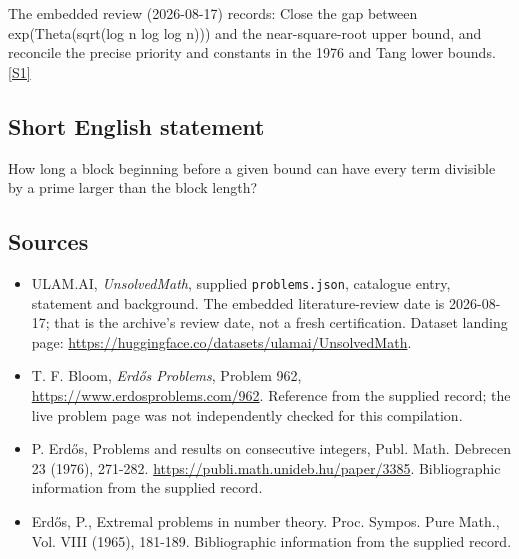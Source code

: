 \documentclass[11pt,a4paper]{article}
\newcommand{\sref}[2]{\hyperlink{source:#1:#2}{[S#2]}}
\begin{document}
The embedded review (2026-08-17) records: Close the gap between exp(Theta(sqrt(log n log log n))) and the near-square-root upper bound, and reconcile the precise priority and constants in the 1976 and Tang lower bounds. \sref{statement}{1}

\subsection{Short English statement}

How long a block beginning before a given bound can have every term divisible by a prime larger than the block length?

\subsection{Sources}

{\small

\begin{itemize}

\item[\hypertarget{source:statement:1}{S1}] ULAM.AI, \emph{UnsolvedMath}, supplied \texttt{problems.json}, catalogue entry, statement and background. The embedded literature-review date is 2026-08-17; that is the archive’s review date, not a fresh certification. Dataset landing page: \url{https://huggingface.co/datasets/ulamai/UnsolvedMath}.

\item[\hypertarget{source:statement:2}{S2}] T. F. Bloom, \emph{Erdős Problems}, Problem 962, \url{https://www.erdosproblems.com/962}. Reference from the supplied record; the live problem page was not independently checked for this compilation.

\item[\hypertarget{source:statement:3}{S3}] P. Erdős, Problems and results on consecutive integers, Publ. Math. Debrecen 23 (1976), 271-282. \url{https://publi.math.unideb.hu/paper/3385}. Bibliographic information from the supplied record.

\item[\hypertarget{source:statement:4}{S4}] Erd\H{o}s, P., Extremal problems in number theory. Proc. Sympos. Pure Math., Vol. VIII (1965), 181-189. Bibliographic information from the supplied record.

\end{itemize}

}

\label{end:statement}
\end{document}
